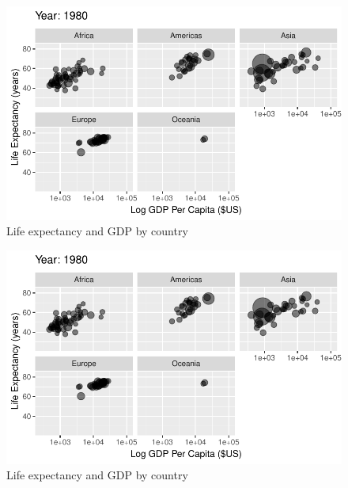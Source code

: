 \documentclass[
  letterpaper,
  DIV=11,
  numbers=noendperiod]{scrreport}
\theoremstyle{definition}
\theoremstyle{remark}
\begin{document}
\begin{figure}

{\centering \includegraphics{index_files/figure-pdf/fig-anim-lifegdp-51.pdf}

}

\caption{\label{fig-anim-lifegdp-51}Life expectancy and GDP by country}

\end{figure}

\begin{figure}

{\centering \includegraphics{index_files/figure-pdf/fig-anim-lifegdp-52.pdf}

}

\caption{\label{fig-anim-lifegdp-52}Life expectancy and GDP by country}

\end{figure}
\end{document}
